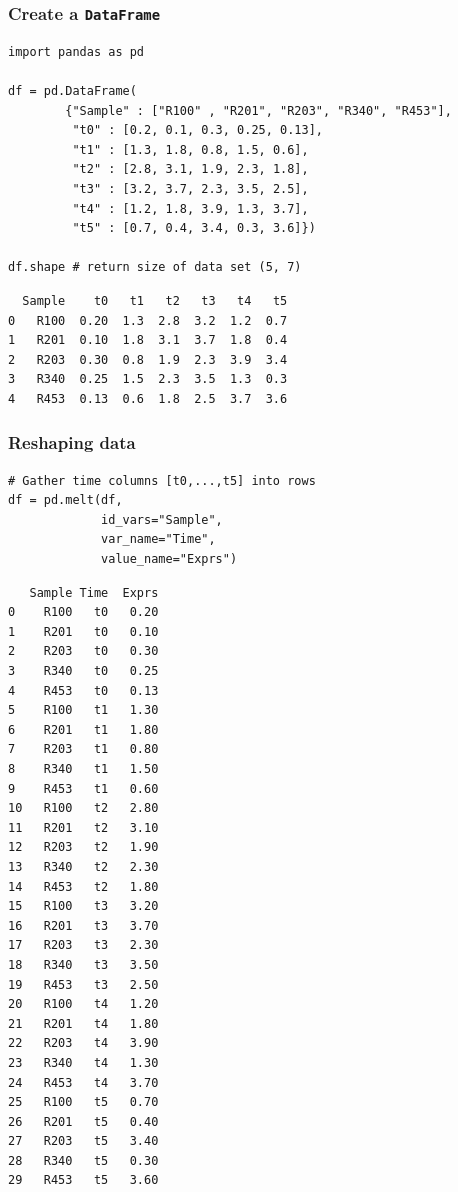 \documentclass[xcolor=table]{beamer}
\begin{document}
\begin{frame}[fragile]
\frametitle{Create a \texttt{DataFrame}}

\begin{lstlisting}[style=python]
import pandas as pd

df = pd.DataFrame(
        {"Sample" : ["R100" , "R201", "R203", "R340", "R453"],
         "t0" : [0.2, 0.1, 0.3, 0.25, 0.13], 
         "t1" : [1.3, 1.8, 0.8, 1.5, 0.6],
         "t2" : [2.8, 3.1, 1.9, 2.3, 1.8],
         "t3" : [3.2, 3.7, 2.3, 3.5, 2.5],
         "t4" : [1.2, 1.8, 3.9, 1.3, 3.7],
         "t5" : [0.7, 0.4, 3.4, 0.3, 3.6]})

df.shape # return size of data set (5, 7)
\end{lstlisting}

\vspace{-0.8cm}

\footnotesize
\begin{verbatim}
  Sample    t0   t1   t2   t3   t4   t5
0   R100  0.20  1.3  2.8  3.2  1.2  0.7
1   R201  0.10  1.8  3.1  3.7  1.8  0.4
2   R203  0.30  0.8  1.9  2.3  3.9  3.4
3   R340  0.25  1.5  2.3  3.5  1.3  0.3
4   R453  0.13  0.6  1.8  2.5  3.7  3.6
\end{verbatim}
\normalsize

\end{frame}

\begin{frame}[fragile]
\frametitle{Reshaping data}

\begin{lstlisting}[style=python]
# Gather time columns [t0,...,t5] into rows
df = pd.melt(df, 
             id_vars="Sample", 
             var_name="Time",
             value_name="Exprs")
\end{lstlisting}

\vspace{-0.8cm}

{\fontsize{5}{5}\selectfont
\begin{verbatim}
   Sample Time  Exprs
0    R100   t0   0.20
1    R201   t0   0.10
2    R203   t0   0.30
3    R340   t0   0.25
4    R453   t0   0.13
5    R100   t1   1.30
6    R201   t1   1.80
7    R203   t1   0.80
8    R340   t1   1.50
9    R453   t1   0.60
10   R100   t2   2.80
11   R201   t2   3.10
12   R203   t2   1.90
13   R340   t2   2.30
14   R453   t2   1.80
15   R100   t3   3.20
16   R201   t3   3.70
17   R203   t3   2.30
18   R340   t3   3.50
19   R453   t3   2.50
20   R100   t4   1.20
21   R201   t4   1.80
22   R203   t4   3.90
23   R340   t4   1.30
24   R453   t4   3.70
25   R100   t5   0.70
26   R201   t5   0.40
27   R203   t5   3.40
28   R340   t5   0.30
29   R453   t5   3.60
\end{verbatim}}

\end{frame}
\end{document}

